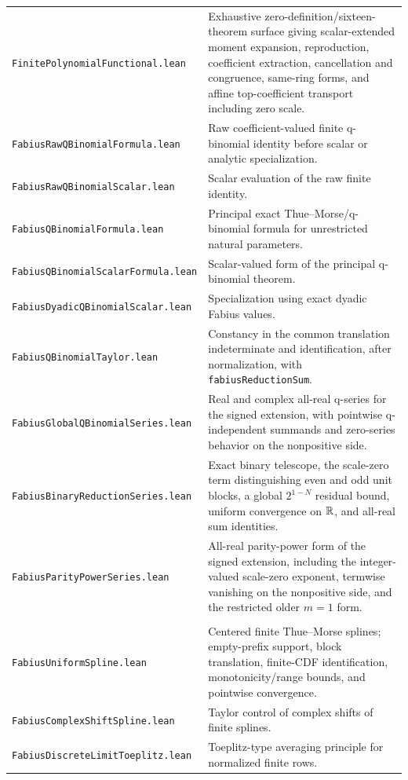 \documentclass[11pt,oneside]{article}
\theoremstyle{definition}
\theoremstyle{remark}
\begin{document}
\begin{longtable}{>{\raggedright\arraybackslash}p{} >{\raggedright\arraybackslash}p{}}
\nolinkurl{FinitePolynomialFunctional.lean} & Exhaustive zero-definition/sixteen-theorem surface giving scalar-extended moment expansion, reproduction, coefficient extraction, cancellation and congruence, same-ring forms, and affine top-coefficient transport including zero scale. \\
\nolinkurl{FabiusRawQBinomialFormula.lean} & Raw coefficient-valued finite q-binomial identity before scalar or analytic specialization. \\
\nolinkurl{FabiusRawQBinomialScalar.lean} & Scalar evaluation of the raw finite identity. \\
\nolinkurl{FabiusQBinomialFormula.lean} & Principal exact Thue--Morse/q-binomial formula for unrestricted natural parameters. \\
\nolinkurl{FabiusQBinomialScalarFormula.lean} & Scalar-valued form of the principal q-binomial theorem. \\
\nolinkurl{FabiusDyadicQBinomialScalar.lean} & Specialization using exact dyadic Fabius values. \\
\nolinkurl{FabiusQBinomialTaylor.lean} & Constancy in the common translation indeterminate and identification, after normalization, with \nolinkurl{fabiusReductionSum}. \\
\nolinkurl{FabiusGlobalQBinomialSeries.lean} & Real and complex all-real q-series for the signed extension, with pointwise q-independent summands and zero-series behavior on the nonpositive side. \\
\nolinkurl{FabiusBinaryReductionSeries.lean} & Exact binary telescope, the scale-zero term distinguishing even and odd unit blocks, a global \(2^{1-N}\) residual bound, uniform convergence on \(\mathbb{R}\), and all-real sum identities. \\
\nolinkurl{FabiusParityPowerSeries.lean} & All-real parity-power form of the signed extension, including the integer-valued scale-zero exponent, termwise vanishing on the nonpositive side, and the restricted older \(m=1\) form. \\
\addlinespace[0.45em]
\multicolumn{2}{l}{\textbf{Discrete-limit family}}\\[0.25em]
\nolinkurl{FabiusUniformSpline.lean} & Centered finite Thue--Morse splines; empty-prefix support, block translation, finite-CDF identification, monotonicity/range bounds, and pointwise convergence. \\
\nolinkurl{FabiusComplexShiftSpline.lean} & Taylor control of complex shifts of finite splines. \\
\nolinkurl{FabiusDiscreteLimitToeplitz.lean} & Toeplitz-type averaging principle for normalized finite rows. \\

\end{longtable}
\end{document}
